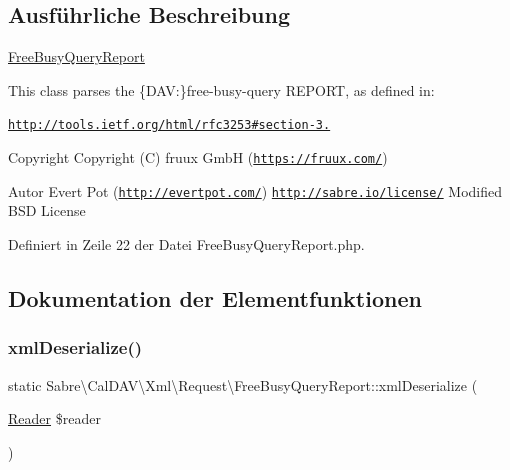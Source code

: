 \subsection{Ausführliche Beschreibung}
\mbox{\hyperlink{class_sabre_1_1_cal_d_a_v_1_1_xml_1_1_request_1_1_free_busy_query_report}{Free\+Busy\+Query\+Report}}

This class parses the \{D\+AV\+:\}free-\/busy-\/query R\+E\+P\+O\+RT, as defined in\+:

\href{http://tools.ietf.org/html/rfc3253#section-3.8}{\tt http\+://tools.\+ietf.\+org/html/rfc3253\#section-\/3.}

\begin{DoxyCopyright}{Copyright}
Copyright (C) fruux GmbH (\href{https://fruux.com/}{\tt https\+://fruux.\+com/}) 
\end{DoxyCopyright}
\begin{DoxyAuthor}{Autor}
Evert Pot (\href{http://evertpot.com/}{\tt http\+://evertpot.\+com/})  \href{http://sabre.io/license/}{\tt http\+://sabre.\+io/license/} Modified B\+SD License 
\end{DoxyAuthor}


Definiert in Zeile 22 der Datei Free\+Busy\+Query\+Report.\+php.



\subsection{Dokumentation der Elementfunktionen}
\mbox{\label{class_sabre_1_1_cal_d_a_v_1_1_xml_1_1_request_1_1_free_busy_query_report_a31f443d1f4d3e0a0e853f2079a76307f}} 
\subsubsection{\texorpdfstring{xml\+Deserialize()}{xmlDeserialize()}}
{\footnotesize\ttfamily static Sabre\textbackslash{}\+Cal\+D\+A\+V\textbackslash{}\+Xml\textbackslash{}\+Request\textbackslash{}\+Free\+Busy\+Query\+Report\+::xml\+Deserialize (\begin{DoxyParamCaption}\item[{\mbox{\hyperlink{class_sabre_1_1_xml_1_1_reader}{Reader}}}]{\$reader }\end{DoxyParamCaption})\hspace{0.3cm}{\ttfamily [static]}}

